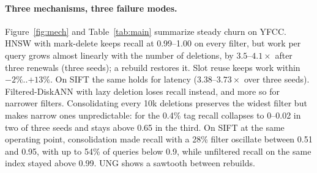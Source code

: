 \documentclass[10pt,a4paper]{article}
\begin{document}
\paragraph{Three mechanisms, three failure modes.} Figure~\ref{fig:mech} and Table~\ref{tab:main} summarize steady churn on YFCC. HNSW with mark-delete keeps recall at 0.99--1.00 on every filter, but work per query grows almost linearly with the number of deletions, by $3.5$--$4.1\times$ after three renewals (three seeds); a rebuild restores it. Slot reuse keeps work within $-2\%$..$+13\%$. On SIFT the same holds for latency ($3.38$--$3.73\times$ over three seeds). Filtered-DiskANN with lazy deletion loses recall instead, and more so for narrower filters. Consolidating every 10k deletions preserves the widest filter but makes narrow ones unpredictable: for the 0.4\% tag recall collapses to 0--0.02 in two of three seeds and stays above 0.65 in the third. On SIFT at the same operating point, consolidation made recall with a 28\% filter oscillate between 0.51 and 0.95, with up to 54\% of queries below 0.9, while unfiltered recall on the same index stayed above 0.99. UNG shows a sawtooth between rebuilds.

\begin{table}[t]
\centering\small
\caption{YFCC-10M, steady churn, 300k operations: start $\to$ end, ranges over three seeds. Work is distance computations per query relative to the fresh index.}
\label{tab:main}
\end{table}
\end{document}
